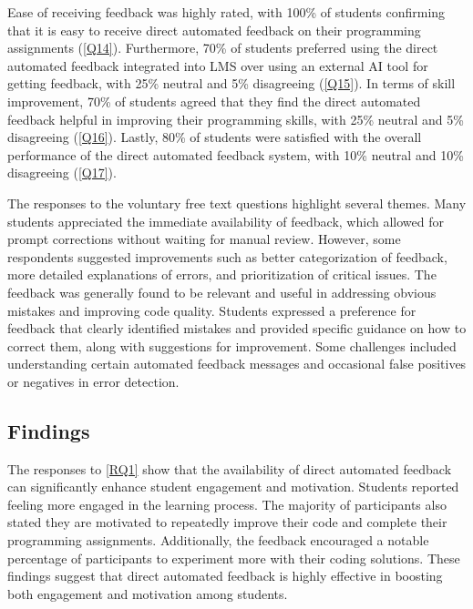 \documentclass[manuscript,screen,review, anonymous]{acmart}
\begin{document}
Ease of receiving feedback was highly rated, with 100\% of students confirming that it is easy to receive direct automated feedback on their programming assignments (\ref{Q14}).
Furthermore, 70\% of students preferred using the direct automated feedback integrated into LMS over using an external AI tool for getting feedback, with 25\% neutral and 5\% disagreeing (\ref{Q15}).
In terms of skill improvement, 70\% of students agreed that they find the direct automated feedback helpful in improving their programming skills, with 25\% neutral and 5\% disagreeing (\ref{Q16}).
Lastly, 80\% of students were satisfied with the overall performance of the direct automated feedback system, with 10\% neutral and 10\% disagreeing (\ref{Q17}).


The responses to the voluntary free text questions highlight several themes.
Many students appreciated the immediate availability of feedback, which allowed for prompt corrections without waiting for manual review. 
However, some respondents suggested improvements such as better categorization of feedback, more detailed explanations of errors, and prioritization of critical issues. 
The feedback was generally found to be relevant and useful in addressing obvious mistakes and improving code quality. 
Students expressed a preference for feedback that clearly identified mistakes and provided specific guidance on how to correct them, along with suggestions for improvement. 
Some challenges included understanding certain automated feedback messages and occasional false positives or negatives in error detection.


\subsection{Findings}

The responses to \ref{RQ1} show that the availability of direct automated feedback can significantly enhance student engagement and motivation.
Students reported feeling more engaged in the learning process.
The majority of participants also stated they are motivated to repeatedly improve their code and complete their programming assignments.
Additionally, the feedback encouraged a notable percentage of participants to experiment more with their coding solutions.
These findings suggest that direct automated feedback is highly effective in boosting both engagement and motivation among students.
\end{document}
